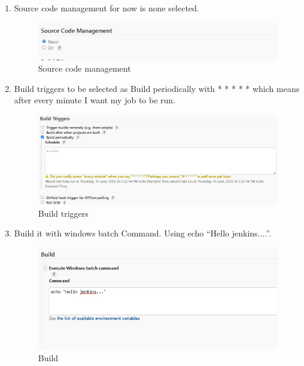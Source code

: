 \documentclass[12pt]{article}
\begin{document}
\begin{enumerate}
\item Source code management for now is none selected.

\begin{figure}[H]
\centering
\includegraphics[scale=0.6]{fig66}
\caption{Source code management}
\vspace{0.6\baselineskip}
\end{figure}

\item Build triggers to be selected as Build periodically with * * * * * which
means after every minute I want my job to be run.

\begin{figure}[H]
\centering
\includegraphics[scale=0.6]{fig67}
\caption{Build triggers}
\vspace{0.6\baselineskip}
\end{figure}

\item Build it with windows batch Command. Using echo “Hello jenkins....”.

\begin{figure}[H]
\centering
\includegraphics[scale=0.5]{fig68}
\caption{Build }
\vspace{0.6\baselineskip}
\end{figure}


\end{enumerate}
\end{document}
